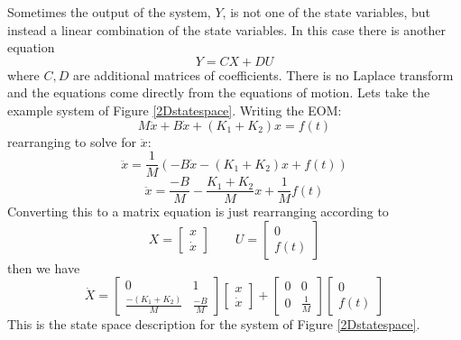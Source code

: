 \documentclass[letterpaper]{book}
\begin{document}
Sometimes the output of the system, $Y$, is not one of the state variables, but instead a linear
combination of the state variables.  In this case there is another equation 
\[
Y = CX+DU
\]
where $C,D$ are additional matrices of coefficients.   There is no Laplace transform and the 
equations come directly from the equations of motion.  Lets take the example system of Figure \ref{2Dstatespace}.  Writing the EOM:
\[
M\ddot{x}+B\dot{x}+(K_1+K_2)x = f(t)
\]
rearranging to solve for $\ddot{x}$:
\[
\ddot{x} = \frac{1}{M}(-B\dot{x}-(K_1+K_2)x+f(t))
\]
\[
\ddot{x} = \frac{-B}{M} - \frac{K_1+K_2}{M}x + \frac{1}{M}f(t)
\]
Converting this to a matrix equation is just rearranging according to 
\[
X = \begin{bmatrix} x \\ \dot{x} \end{bmatrix}  \qquad U = \begin{bmatrix}0\\f(t)\end{bmatrix}
\]
then we have
\[
\dot{X} = \begin{bmatrix}0&1\\\frac{-(K_1+K_2)}{M}&\frac{-B}{M}\end{bmatrix}
\begin{bmatrix}x\\ \dot{x}\end{bmatrix}+
\begin{bmatrix}0&0\\0&\frac{1}{M}\end{bmatrix}
\begin{bmatrix}0\\f(t)\end{bmatrix}
\]
This is the state space description for the system of Figure \ref{2Dstatespace}.
\end{document}
